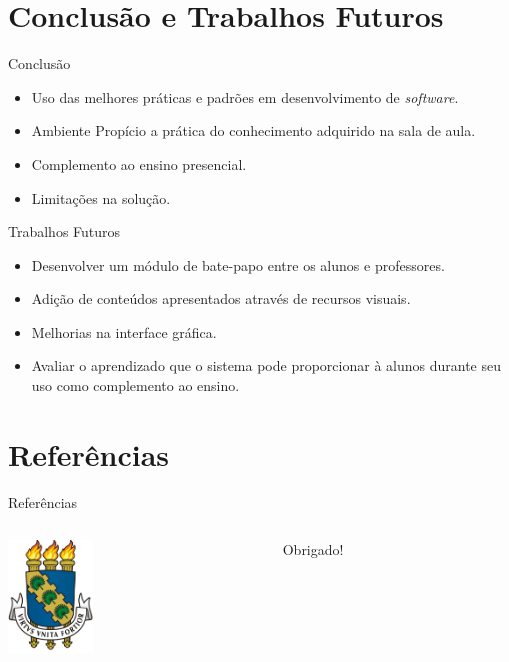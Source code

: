 \documentclass[aspectratio=169]{beamer}
\begin{document}
\section{Conclusão e Trabalhos Futuros}

\begin{frame}{Conclusão}
   \begin{itemize}
   		\item Uso das melhores práticas e padrões em desenvolvimento de \textit{software}.
   		\item Ambiente Propício a prática do conhecimento adquirido na sala de aula.
		\item Complemento ao ensino presencial.
		\item Limitações na solução.
   \end{itemize}
\end{frame}

\begin{frame}{Trabalhos Futuros}
   \begin{itemize}
   		\item Desenvolver um módulo de bate-papo entre os alunos e
professores.
   		\item Adição de conteúdos apresentados através de recursos visuais.
   		\item Melhorias na interface gráfica.
   		\item Avaliar o aprendizado que o sistema pode proporcionar à alunos durante seu uso como complemento ao ensino.
   \end{itemize}
\end{frame}

\section{Referências}

\begin{frame}[allowframebreaks]{Referências}
	
\end{frame}


\begin{frame}
	\begin{columns}
		\begin{column}{3cm}
			\includegraphics[height=3cm]{figuras/logo.png}
		\end{column}
		\begin{column}{7cm}
			\begin{flushright}
				\centering
				\vskip 0.5cm
				\Huge Obrigado!
			\end{flushright}
		\end{column}
	\end{columns}
\end{frame}


\end{document}
